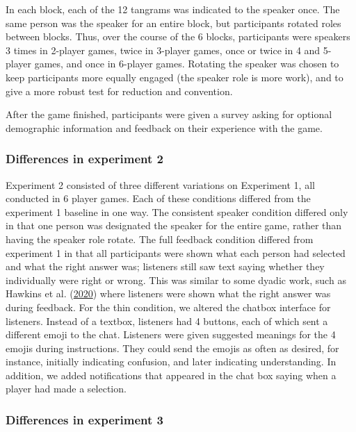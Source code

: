 \documentclass[
  english,
  a4paper,
]{article}
\begin{document}
In each block, each of the 12 tangrams was indicated to the speaker once. The same person was the speaker for an entire block, but participants rotated roles between blocks. Thus, over the course of the 6 blocks, participants were speakers 3 times in 2-player games, twice in 3-player games, once or twice in 4 and 5-player games, and once in 6-player games. Rotating the speaker was chosen to keep participants more equally engaged (the speaker role is more work), and to give a more robust test for reduction and convention.

After the game finished, participants were given a survey asking for optional demographic information and feedback on their experience with the game.

\hypertarget{differences-in-experiment-2}{%
\subsubsection{Differences in experiment 2}\label{differences-in-experiment-2}}

Experiment 2 consisted of three different variations on Experiment 1, all conducted in 6 player games. Each of these conditions differed from the experiment 1 baseline in one way. The consistent speaker condition differed only in that one person was designated the speaker for the entire game, rather than having the speaker role rotate. The full feedback condition differed from experiment 1 in that all participants were shown what each person had selected and what the right answer was; listeners still saw text saying whether they individually were right or wrong. This was similar to some dyadic work, such as Hawkins et al. (\protect\hyperlink{ref-hawkins2020}{2020}) where listeners were shown what the right answer was during feedback. For the thin condition, we altered the chatbox interface for listeners. Instead of a textbox, listeners had 4 buttons, each of which sent a different emoji to the chat. Listeners were given suggested meanings for the 4 emojis during instructions. They could send the emojis as often as desired, for instance, initially indicating confusion, and later indicating understanding. In addition, we added notifications that appeared in the chat box saying when a player had made a selection.

\hypertarget{differences-in-experiment-3}{%
\subsubsection{Differences in experiment 3}\label{differences-in-experiment-3}}
\end{document}

